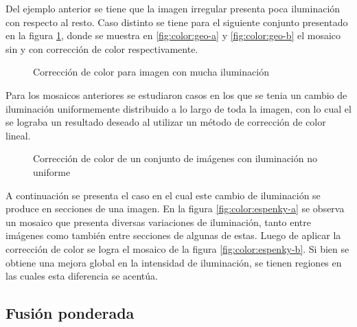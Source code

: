 Del ejemplo anterior se tiene que la imagen irregular presenta poca iluminación con respecto al resto. Caso distinto se tiene para el siguiente conjunto presentado en la figura \ref{imagen:color:0233}, donde se muestra en \ref{fig:color:geo-a} y \ref{fig:color:geo-b} el mosaico sin y con corrección de color respectivamente. 

\begin{figure}[h]
	\centering     %
	
	\caption[Resultado de corrección de color]{Corrección de color para imagen con mucha iluminación}
	\label{imagen:color:0233}
\end{figure}

Para los mosaicos anteriores se estudiaron casos en los que se tenia un cambio de iluminación uniformemente distribuido a lo largo de toda la imagen, con lo cual el se lograba un resultado deseado al utilizar un método de corrección de color lineal.

\begin{figure}[H]
	\centering     %
	
	\caption[Resultado de corrección de color: \textit{Espenky}]{Corrección de color de un conjunto de imágenes con iluminación no uniforme}
	\label{imagen:color:espenky}
\end{figure}

A continuación se presenta el caso en el cual este cambio de iluminación se produce en secciones de una imagen. En la figura \ref{fig:color:espenky-a} se observa un mosaico que presenta diversas variaciones de iluminación, tanto entre imágenes como también entre secciones de algunas de estas. Luego de aplicar la corrección de color se logra el mosaico de la figura \ref{fig:color:espenky-b}. Si bien se obtiene una mejora global en la intensidad de iluminación, se tienen regiones en las cuales esta diferencia se acentúa.



\subsection*{Fusión ponderada}

